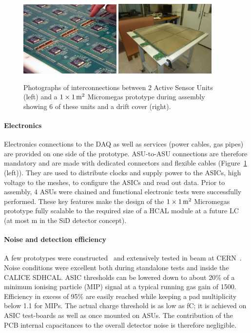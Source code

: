 \begin{figure}
\begin{centering}
\includegraphics[width=0.45\textwidth]{Calorimeter/SDHCAL/interconnects}
\includegraphics[width=0.45\textwidth]{Calorimeter/SDHCAL/m2_assembly}
\caption{Photographs of interconnections between 2 Active Sensor Units (left) and a $1\times \unit[1]{m^{2}}$ Micromegas prototype during assembly showing 6 of these units and a drift cover (right).}
\label{mecha_elec}
\end{centering}
\end{figure}


\paragraph{Electronics}
Electronics connections to the DAQ as well as services (power cables, gas pipes) are provided on one side of the prototype. ASU-to-ASU connections are therefore mandatory and are made with dedicated connectors and flexible cables (Figure~\ref{mecha_elec} (left)). They are used to distribute clocks and supply power to the ASICs, high voltage to the meshes, to configure the ASICs and read out data. Prior to assembly, 4 ASUs were chained and functional electronic tests were successfully performed. These key features make the design of the $1\times \unit[1]{m^{2}}$ Micromegas prototype fully scalable to the required size of a HCAL module at a future LC (at most \unit[2]{m} in the SiD detector concept).

\paragraph{Noise and detection efficiency}
A few prototypes were constructed~\cite{Adloff201390} and extensively tested in beam at CERN~\cite{Adloff:2014qea}. Noise conditions were excellent both during standalone tests and inside the CALICE SDHCAL. ASIC thresholds can be lowered down to about 20\% of a minimum ionising particle (MIP) signal at a typical running gas gain of 1500. Efficiency in excess of 95\% are easily reached while keeping a pad multiplicity below 1.1 for MIPs. The actual charge threshold is as low as \unit[1--2]{fC}; it is achieved on ASIC test-boards as well as once mounted on ASUs. The contribution of the PCB internal capacitances to the overall detector noise is therefore negligible.

